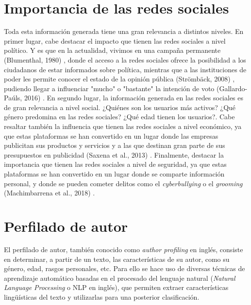 \section{Importancia de las redes sociales}
\label{sec:intr_importancia}
Toda esta información generada tiene una gran relevancia a distintos niveles. En primer lugar, cabe destacar el impacto que
tienen las redes sociales a nivel político. Y es que en la actualidad, vivimos en una campaña permanente (Blumenthal, 1980)
\cite{sydney1980permanent}, 
donde el acceso a la redes sociales ofrece la posibilidad a los ciudadanos de estar informados sobre política, mientras que a las instituciones
de poder les permite conocer el estado de la opinión pública (Strömbäck, 2008)
\cite{stromback2008four}, pudiendo llegar a influenciar "mucho" o "bastante" la intención de voto (Gallardo-Paúls, 2016) \cite{gallardo2016pseudopolitica}.
En segundo lugar, la información generada en las redes sociales es de gran relevancia a nivel social. ¿Quiénes son los
usuarios más activos? ¿Qué género predomina en las redes sociales? ¿Qué edad tienen los usuarios?. Cabe resaltar también la influencia
que tienen las redes sociales a nivel económico, ya que estas plataformas se han convertido en un lugar donde las empresas
publicitan sus productos y servicios y a las que destinan gran parte de sus presupuestos en publicidad 
(Saxena et al., 2013) \cite{saxena2013advertising}. Finalmente, destacar la importancia que tienen las redes sociales a nivel de seguridad,
ya que estas plataformas se han convertido en un lugar donde se comparte información personal, y donde se pueden cometer delitos como
el \textit{cyberbullying} o el \textit{grooming} (Machimbarrena et al., 2018) \cite{machimbarrena2018internet}.

\section{Perfilado de autor}
\label{sec:intro_perfilado}

El perfilado de autor, también conocido como \textit{author profiling} en inglés, consiste en determinar, a partir de un texto, 
las características de su autor, como su género, edad, rasgos personales, etc. Para ello se hace uso de diversas técnicas de aprendizaje automático
basadas en el procesado del lenguaje natural (\textit{Natural Language Processing} o NLP en inglés), que permiten extraer características lingüísticas del texto y utilizarlas para una
posterior clasificación.

